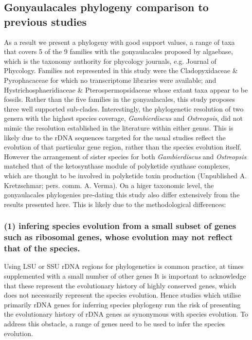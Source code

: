 \documentclass[12pt]{article}
\begin{document}
\subsection*{Gonyaulacales phylogeny comparison to previous studies} 
As a result we present a phylogeny with good support values, a range of taxa that covers 5 of the 9 families with the gonyaulacales proposed by algaebase, which is the taxonomy authority for phycology journals, e.g. Journal of Phycology. 
Families not represented in this study were the Cladopyxidaceae \& Pyrophacaceae for which no transcriptome libraries were available; and Hystrichosphaeridiaceae \& Pterospermopsidaceae whose extant taxa appear to be fossils.
Rather than the five families in the gonyaulacales, this study proposes three well supported sub-clades. 
Interestingly, the phylogenetic resolution of two genera with the highest species coverage, \emph{Gambierdiscus} and \emph{Ostreopsis}, did not mimic the resolution established in the literature within either genus. 
This is likely due to the rDNA sequences targeted for the usual studies reflect the evolution of that particular gene region, rather than the species evolution itself. 
However the arrangement of sister species for both \emph{Gambierdiscus} and \emph{Ostreopsis} matched that of the ketosynthase module of polyketide synthase complexes, which are thought to be involved in polyketide toxin production (Unpublished A. Kretzschmar; pers. comm. A. Verma). 
On a higer taxonomic level, the gonyaulacales phylogenies pre-dating this study also differ extensively from the results presented here. 
This is likely due to the methodological differences: 
\subsubsection*{(1) infering species evolution from a small subset of genes such as ribosomal genes, whose evolution may not reflect that of the species.}
Using LSU or SSU rDNA regions for phylogenetics is common practice, at times supplemented with a small number of other genes \cite{shalchian2006combined,zhang2007three,saldarriaga2004molecular,murray2005improving,hoppenrath2010dinoflagellate} 
It is important to acknowledge that these represent the evolutionary history of highly conserved genes, which does not necessarily represent the species evolution. 
Hence studies which utilise primarily rDNA genes for inferring species phylogeny run the risk of presenting the evolutionary history of rDNA genes as synonymous with species evolution.
To address this obstacle, a range of genes need to be used to infer the species evolution.
\end{document}

